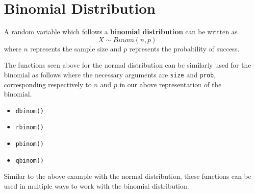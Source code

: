 \documentclass{report}\usepackage[]{graphicx}\usepackage[]{color}
\begin{document}
\section{Binomial Distribution}
A random variable which follows a \textbf{binomial distribution} can be written as
\[ X \sim Binom(n,p) \]
where $n$ represents the sample size and $p$ represents the probability of success.  

The functions seen above for the normal distribution can be similarly used for the binomial as follows where the necessary arguments are \texttt{size} and \texttt{prob}, corresponding respectively to $n$ and $p$ in our above representation of the binomial.
\begin{itemize} 
\item \texttt{dbinom()}
\item \texttt{rbinom()}
\item \texttt{pbinom()}
\item \texttt{qbinom()}
\end{itemize}

Similar to the above example with the normal distribution, these functions can be used in multiple ways to work with the binomial distribution.  
\end{document}
